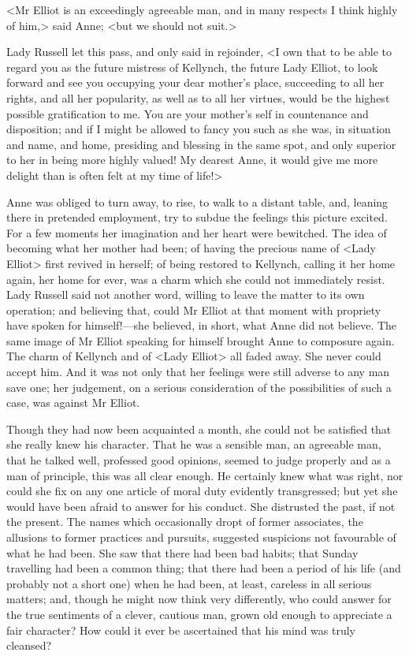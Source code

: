 <Mr Elliot is an exceedingly agreeable man, and in many respects I think highly of him,> said Anne; <but we should not suit.>

Lady Russell let this pass, and only said in rejoinder, <I own that to be able to regard you as the future mistress of Kellynch, the future Lady Elliot, to look forward and see you occupying your dear mother's place, succeeding to all her rights, and all her popularity, as well as to all her virtues, would be the highest possible gratification to me. You are your mother's self in countenance and disposition; and if I might be allowed to fancy you such as she was, in situation and name, and home, presiding and blessing in the same spot, and only superior to her in being more highly valued! My dearest Anne, it would give me more delight than is often felt at my time of life!>

Anne was obliged to turn away, to rise, to walk to a distant table, and, leaning there in pretended employment, try to subdue the feelings this picture excited. For a few moments her imagination and her heart were bewitched. The idea of becoming what her mother had been; of having the precious name of <Lady Elliot> first revived in herself; of being restored to Kellynch, calling it her home again, her home for ever, was a charm which she could not immediately resist. Lady Russell said not another word, willing to leave the matter to its own operation; and believing that, could Mr Elliot at that moment with propriety have spoken for himself!—she believed, in short, what Anne did not believe. The same image of Mr Elliot speaking for himself brought Anne to composure again. The charm of Kellynch and of <Lady Elliot> all faded away. She never could accept him. And it was not only that her feelings were still adverse to any man save one; her judgement, on a serious consideration of the possibilities of such a case, was against Mr Elliot.

Though they had now been acquainted a month, she could not be satisfied that she really knew his character. That he was a sensible man, an agreeable man, that he talked well, professed good opinions, seemed to judge properly and as a man of principle, this was all clear enough. He certainly knew what was right, nor could she fix on any one article of moral duty evidently transgressed; but yet she would have been afraid to answer for his conduct. She distrusted the past, if not the present. The names which occasionally dropt of former associates, the allusions to former practices and pursuits, suggested suspicions not favourable of what he had been. She saw that there had been bad habits; that Sunday travelling had been a common thing; that there had been a period of his life (and probably not a short one) when he had been, at least, careless in all serious matters; and, though he might now think very differently, who could answer for the true sentiments of a clever, cautious man, grown old enough to appreciate a fair character? How could it ever be ascertained that his mind was truly cleansed?

